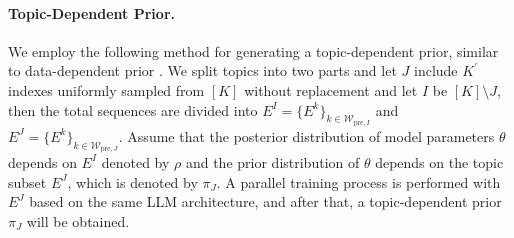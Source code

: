 \paragraph{Topic-Dependent Prior.} We employ the following method for generating a topic-dependent prior, similar to data-dependent prior \citep{li2019generalization}. We split topics into two parts and let $J$ include $K^{\prime}$ indexes uniformly sampled from $[K]$ without replacement and let $I$ be $[K]\setminus J$, then the total sequences are divided into $E^I=\{E^k\}_{k \in \mathcal{W}_{\text{pre},I}}$ and $E^J=\{E^k\}_{k \in \mathcal{W}_{\text{pre},J}}$. Assume that the posterior distribution of model parameters $\theta$ depends on $E^I$ denoted by $\rho$ and the prior distribution of $\theta$ depends on the topic subset $E^J$, which is denoted by $\pi_J$. A parallel training process is performed with $E^J$ based on the same LLM architecture, and after that, a topic-dependent prior $\pi_J$ will be obtained.


